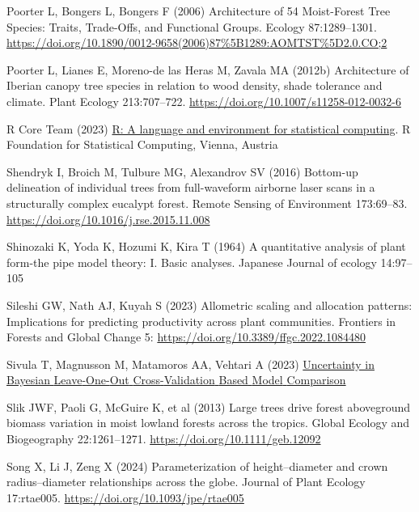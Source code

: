 \documentclass[
  12pt,
  letterpaper,
  DIV=11,
  numbers=noendperiod]{scrartcl}
\newlength{\cslhangindent}
\newlength{\cslentryspacingunit} %
\newenvironment{CSLReferences}[2] %
 {%
  \setlength{\parindent}{0pt}
  \ifodd #1
  \let\oldpar\par
  \def\par{\hangindent=\cslhangindent\oldpar}
  \fi
  \setlength{\parskip}{#2\cslentryspacingunit}
 }%
 {}
\begin{document}
\begin{CSLReferences}{1}{0}
\leavevmode{}%
Poorter L, Bongers L, Bongers F (2006) Architecture of 54
{Moist}-{Forest} {Tree} {Species}: {Traits}, {Trade}-{Offs}, and
{Functional} {Groups}. Ecology 87:1289--1301.
\url{https://doi.org/10.1890/0012-9658(2006)87\%5B1289:AOMTST\%5D2.0.CO;2}

\leavevmode{}%
Poorter L, Lianes E, Moreno-de las Heras M, Zavala MA (2012b)
Architecture of {Iberian} canopy tree species in relation to wood
density, shade tolerance and climate. Plant Ecology 213:707--722.
\url{https://doi.org/10.1007/s11258-012-0032-6}

\leavevmode{}%
R Core Team (2023) \href{https://www.R-project.org/}{R: A language and
environment for statistical computing}. R Foundation for Statistical
Computing, Vienna, Austria

\leavevmode{}%
Shendryk I, Broich M, Tulbure MG, Alexandrov SV (2016) Bottom-up
delineation of individual trees from full-waveform airborne laser scans
in a structurally complex eucalypt forest. Remote Sensing of Environment
173:69--83. \url{https://doi.org/10.1016/j.rse.2015.11.008}

\leavevmode{}%
Shinozaki K, Yoda K, Hozumi K, Kira T (1964) A quantitative analysis of
plant form-the pipe model theory: I. Basic analyses. Japanese Journal of
ecology 14:97--105

\leavevmode{}%
Sileshi GW, Nath AJ, Kuyah S (2023) Allometric scaling and allocation
patterns: {Implications} for predicting productivity across plant
communities. Frontiers in Forests and Global Change 5:
\url{https://doi.org/10.3389/ffgc.2022.1084480}

\leavevmode{}%
Sivula T, Magnusson M, Matamoros AA, Vehtari A (2023)
\href{https://doi.org/10.48550/arXiv.2008.10296}{Uncertainty in
{Bayesian} {Leave}-{One}-{Out} {Cross}-{Validation} {Based} {Model}
{Comparison}}

\leavevmode{}%
Slik JWF, Paoli G, McGuire K, et al (2013) Large trees drive forest
aboveground biomass variation in moist lowland forests across the
tropics. Global Ecology and Biogeography 22:1261--1271.
\url{https://doi.org/10.1111/geb.12092}

\leavevmode{}%
Song X, Li J, Zeng X (2024) Parameterization of height--diameter and
crown radius--diameter relationships across the globe. Journal of Plant
Ecology 17:rtae005. \url{https://doi.org/10.1093/jpe/rtae005}


\end{CSLReferences}
\end{document}
